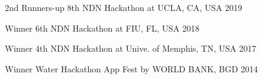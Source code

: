 



\begin{cvhonors}

  \cvhonor
    {2nd Runners-up} %
    {8th NDN Hackathon at UCLA, CA, USA} %
    {2019} %

  \cvhonor
    {Winner} %
    {6th NDN Hackathon at FIU, FL, USA} %
    {2018} %

  \cvhonor
    {Winner} %
    {4th NDN Hackathon at Unive. of Memphis, TN, USA} %
    {2017} %



  \cvhonor
    {Winner} %
    {Water Hackathon App Fest by WORLD BANK, BGD} %
    {2014} %



\end{cvhonors}


